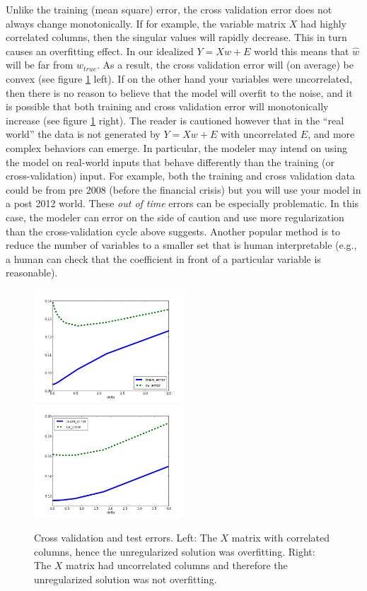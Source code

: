 Unlike the training (mean square) error, the cross validation error does not always change monotonically.  If for example, the variable matrix $X$ had highly correlated columns, then the singular values will rapidly decrease.  This in turn causes an overfitting effect.  In our idealized $Y = Xw + E$ world this means that $\hat w$ will be far from $w_{true}$.  As a result, the cross validation error will (on average) be convex (see figure \ref{linear:fig:overfitting} left).  If on the other hand your variables were uncorrelated, then there is no reason to believe that the model will overfit to the noise, and it is possible that both training and cross validation error will monotonically increase (see figure \ref{linear:fig:overfitting} right).  The reader is cautioned however that in the ``real world'' the data is not generated by $Y = Xw + E$ with uncorrelated $E$, and more complex behaviors can emerge.  In particular, the modeler may intend on using the model on real-world inputs that behave differently than the training (or cross-validation) input.  For example, both the training and cross validation data could be from pre 2008 (before the financial crisis) but you will use your model in a post 2012 world.  These \emph{out of time} errors can be especially problematic.  In this case, the modeler can error on the side of caution and use more regularization than the cross-validation cycle above suggests.  Another popular method is to reduce the number of variables to a smaller set that is human interpretable (e.g., a human can check that the coefficient in front of a particular variable is reasonable).

\begin{figure}
  \label{linear:fig:overfitting}
  \includegraphics[width=0.5\textwidth]{../images/train-cv-error}
  \includegraphics[width=0.5\textwidth]{../images/train-cv-error2}
  \caption{Cross validation and test errors.  Left:  The $X$ matrix with correlated columns, hence the unregularized solution was overfitting.  Right:  The $X$ matrix had uncorrelated columns and therefore the unregularized solution was not overfitting.}
\end{figure}

